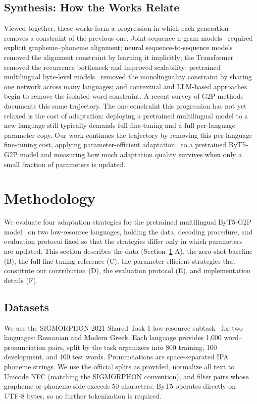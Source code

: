 \documentclass[conference]{IEEEtran}
\begin{document}
\subsection{Synthesis: How the Works Relate}
Viewed together, these works form a progression in which each generation removes a constraint of the previous one. Joint-sequence n-gram models~\cite{bisani2008} required explicit grapheme--phoneme alignment; neural sequence-to-sequence models~\cite{rao2015,yao2015,yolchuyeva2019} removed the alignment constraint by learning it implicitly; the Transformer~\cite{vaswani2017,yolchuyeva2020} removed the recurrence bottleneck and improved scalability; pretrained multilingual byte-level models~\cite{zhu2022,xue2022byt5} removed the monolinguality constraint by sharing one network across many languages; and contextual and LLM-based approaches~\cite{dong2022,fetrat2024} begin to remove the isolated-word constraint. A recent survey of G2P methods~\cite{wang2024} documents this same trajectory. The one constraint this progression has not yet relaxed is the cost of adaptation: deploying a pretrained multilingual model to a new language still typically demands full fine-tuning and a full per-language parameter copy. Our work continues the trajectory by removing this per-language fine-tuning cost, applying parameter-efficient adaptation~\cite{hu2021,houlsby2019} to a pretrained ByT5-G2P model and measuring how much adaptation quality survives when only a small fraction of parameters is updated.

\section{Methodology}\label{sec:method}

We evaluate four adaptation strategies for the pretrained multilingual ByT5-G2P model~\cite{zhu2022,xue2022byt5} on two low-resource languages, holding the data, decoding procedure, and evaluation protocol fixed so that the strategies differ only in which parameters are updated. This section describes the data (Section~\ref{sec:method}-A), the zero-shot baseline (B), the full fine-tuning reference (C), the parameter-efficient strategies that constitute our contribution (D), the evaluation protocol (E), and implementation details (F).

\subsection{Datasets}

We use the SIGMORPHON 2021 Shared Task 1 low-resource subtask~\cite{ashby2021} for two languages: Romanian and Modern Greek. Each language provides 1{,}000 word--pronunciation pairs, split by the task organizers into 800 training, 100 development, and 100 test words. Pronunciations are space-separated IPA phoneme strings. We use the official splits as provided, normalize all text to Unicode NFC (matching the SIGMORPHON convention), and filter pairs whose grapheme or phoneme side exceeds 50 characters; ByT5 operates directly on UTF-8 bytes, so no further tokenization is required.
\end{document}
